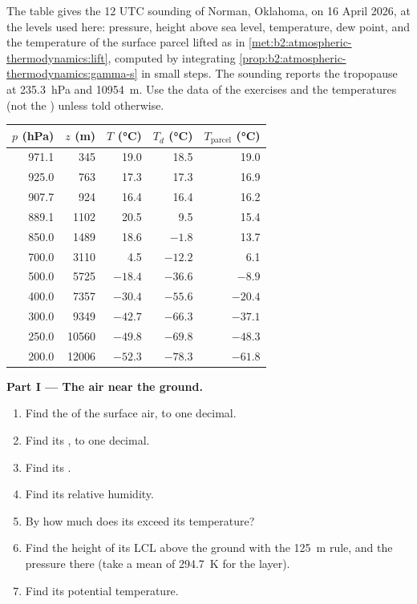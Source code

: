 \begin{problem}\label{pb:b2:atmospheric-thermodynamics:1}
The table gives the 12 UTC sounding of Norman, Oklahoma, on 16 April 2026, at the levels used
here: pressure, height above sea level, temperature, dew point, and the temperature of the
surface parcel lifted as in \cref{met:b2:atmospheric-thermodynamics:lift}, computed by
integrating \cref{prop:b2:atmospheric-thermodynamics:gamma-s} in small steps. The sounding
reports the tropopause at \qty{235.3}{hPa} and \qty{10954}{m}. Use the data of the exercises and
the temperatures (not the ) unless told otherwise.

\begin{center}
\small
\begin{tabular}{rrrrr}
\hline
$p$ (\unit{hPa}) & $z$ (\unit{m}) & $T$ (\unit{\celsius}) & $T_d$ (\unit{\celsius}) &
$T_{\text{parcel}}$ (\unit{\celsius}) \\
\hline
971.1 & 345 & 19.0 & 18.5 & 19.0 \\
925.0 & 763 & 17.3 & 17.3 & 16.9 \\
907.7 & 924 & 16.4 & 16.4 & 16.2 \\
889.1 & 1102 & 20.5 & 9.5 & 15.4 \\
850.0 & 1489 & 18.6 & $-1.8$ & 13.7 \\
700.0 & 3110 & 4.5 & $-12.2$ & 6.1 \\
500.0 & 5725 & $-18.4$ & $-36.6$ & $-8.9$ \\
400.0 & 7357 & $-30.4$ & $-55.6$ & $-20.4$ \\
300.0 & 9349 & $-42.7$ & $-66.3$ & $-37.1$ \\
250.0 & 10560 & $-49.8$ & $-69.8$ & $-48.3$ \\
200.0 & 12006 & $-52.3$ & $-78.3$ & $-61.8$ \\
\hline
\end{tabular}
\end{center}

\medskip\noindent\textbf{Part I --- The air near the ground.}
\begin{enumerate}
  \item Find the  of the surface air, to one decimal.
  \item Find its , to one decimal.
  \item Find its .
  \item Find its relative humidity.
  \item By how much does its  exceed its temperature?
  \item Find the height of its LCL above the ground with the \qty{125}{m} rule, and the pressure
        there (take a mean  of \qty{294.7}{K} for the layer).
  \item Find its potential temperature.
\end{enumerate}


\end{problem}
